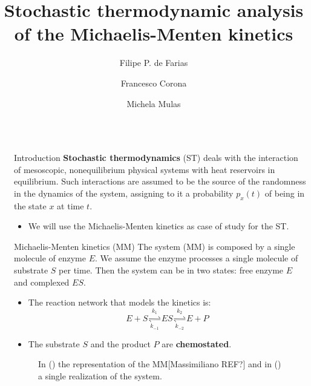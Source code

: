 \documentclass[final]{beamer}
\title{Stochastic thermodynamic analysis of the Michaelis-Menten kinetics}
\author{Filipe P. de Farias\inst{1} \and Francesco Corona\inst{1}  \and Michela Mulas\inst{1}}
\institute[shortinst]{\inst{1}Dept.}
\newlength{\sepwidth}
\newlength{\colwidth}
\newcommand{\separatorcolumn}{\begin{column}{\sepwidth}\end{column}}
\begin{document}
\setlength{\abovedisplayskip}{40pt}
\setlength{\belowdisplayskip}{40pt}

\begin{frame}[t]
\begin{columns}[t]
\separatorcolumn

\begin{column}{\colwidth}

\begin{block}{Introduction}
{\bf Stochastic thermodynamics} (ST) deals with the interaction of mesoscopic, nonequilibrium physical systems with heat reservoirs in equilibrium.\cite{peliti2021stochastic} Such interactions are assumed to be the source of the randomness in the dynamics of the system, assigning to it a probability $p_x(t)$ of being in the state $x$ at time $t$.
\begin{itemize}
\item We will use the Michaelis-Menten kinetics as case of study for the ST.
\end{itemize}
\end{block}

\begin{alertblock}{Michaelis-Menten kinetics (MM)}
The system (MM) is composed by a single molecule of enzyme $E$. We assume the enzyme processes a single molecule of substrate $S$ per time. Then the system can be in two states: free enzyme $E$ and complexed $ES$.
\begin{itemize}
\item The reaction network that models the kinetics is:
\begin{equation}
E + S \underset{k_{-1}}{\stackrel{k_1}{\rightleftharpoons}} ES \underset{k_{-2}}{\stackrel{k_2}{\rightleftharpoons}} E + P
\end{equation}
\item The substrate $S$ and the product $P$ are {\bf chemostated}.
\end{itemize}
\end{alertblock}

\begin{figure}
\label{fig 1}
\begin{subfigure}[b]{0.45\textwidth}

\caption{}
\label{fig 2-state-system}
\end{subfigure}
\hfill
\begin{subfigure}[b]{0.45\textwidth}

\caption{}
\label{fig 2-state-graph}
\end{subfigure}
\caption{In () the representation of the MM[Massimiliano REF?] and in () a single realization of the system.}
\end{figure}



\end{column}
\end{columns}
\end{frame}
\end{document}
